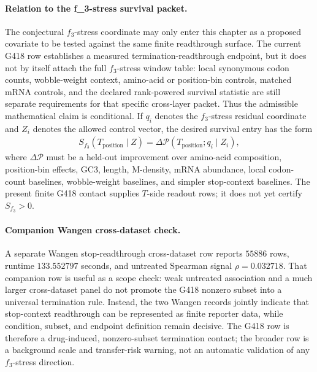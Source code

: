 \paragraph{Relation to the f\_3-stress survival packet.}
The conjectural $f_3$-stress coordinate may only enter this chapter as a proposed covariate to be tested against the same finite readthrough surface. The current G418 row establishes a measured termination-readthrough endpoint, but it does not by itself attach the full $f_3$-stress window table: local synonymous codon counts, wobble-weight context, amino-acid or position-bin controls, matched mRNA controls, and the declared rank-powered survival statistic are still separate requirements for that specific cross-layer packet. Thus the admissible mathematical claim is conditional. If $q_i$ denotes the $f_3$-stress residual coordinate and $Z_i$ denotes the allowed control vector, the desired survival entry has the form
$$
\begin{aligned}
S_{f_3}(T_{\mathrm{position}}\mid Z)
  = \Delta \mathcal{P}(T_{\mathrm{position}}; q_i \mid Z_i),
\end{aligned}
$$
where $\Delta \mathcal{P}$ must be a held-out improvement over amino-acid composition, position-bin effects, GC3, length, M-density, mRNA abundance, local codon-count baselines, wobble-weight baselines, and simpler stop-context baselines. The present finite G418 contact supplies $T$-side readout rows; it does not yet certify $S_{f_3}>0$.

\paragraph{Companion Wangen cross-dataset check.}
A separate Wangen stop-readthrough cross-dataset row reports $55886$ rows, runtime $133.552797$ seconds, and untreated Spearman signal $\rho=0.032718$. That companion row is useful as a scope check: weak untreated association and a much larger cross-dataset panel do not promote the G418 nonzero subset into a universal termination rule. Instead, the two Wangen records jointly indicate that stop-context readthrough can be represented as finite reporter data, while condition, subset, and endpoint definition remain decisive. The G418 row is therefore a drug-induced, nonzero-subset termination contact; the broader row is a background scale and transfer-risk warning, not an automatic validation of any $f_3$-stress direction.

